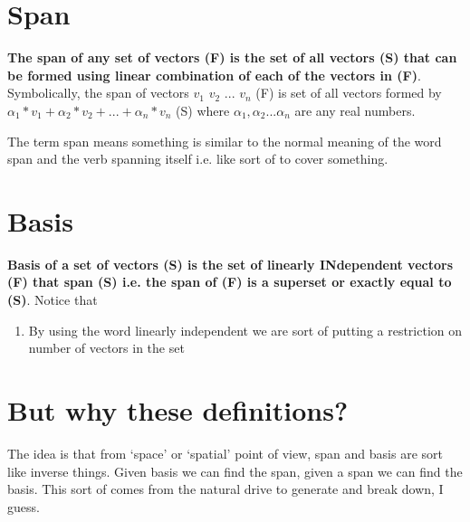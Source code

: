 \documentclass[../main.tex]{subfiles}
\begin{document}
\section{Span}
\textbf{The span of any set of vectors (F) is the set of all vectors (S) that can be formed using linear combination of each of the vectors in (F)}. Symbolically, the span of vectors $ v_1 $ $ v_2 $ ... $ v_n $ (F) is set of all vectors formed by $ \alpha_1 * v_1 + \alpha_2 * v_2 + ... + \alpha_n * v_n $ (S) where $ \alpha_1, \alpha_2 ... \alpha_n $ are any real numbers.

The term span means something is similar to the normal meaning of the word span and the verb spanning itself i.e. like sort of to cover something.

\section{Basis}
\textbf{Basis of a set of vectors (S) is the set of linearly INdependent vectors (F) that span (S) i.e. the span of (F) is a superset or exactly equal to (S)}. Notice that
\begin{enumerate}
  \item By using the word linearly independent we are sort of putting a restriction on number of vectors in the set
\end{enumerate}

\section{But why these definitions?}
The idea is that from `space' or `spatial' point of view, span and basis are sort like inverse things. Given basis we can find the span, given a span we can find the basis. This sort of comes from the natural drive to generate and break down, I guess.

\pagebreak
\end{document}
